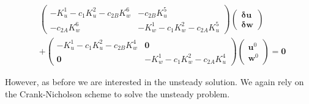 \documentclass[11pt,fleqn]{article}
\theoremstyle{defstyle}
\begin{document}
\begin{equation}
\begin{aligned}
&\begin{pmatrix}
-K^1_u - c_1K^2_u  -c_{2B}K^6_w & -c_{2B}K^5_u \\
-c_{2A}K^6_w & - K^1_w-c_1 K^2_w -c_{2A}K^5_u
\end{pmatrix} \begin{pmatrix}
\mathbf{\delta u} \\ \mathbf{\delta w} 
\end{pmatrix} \\ 
&+ \begin{pmatrix}
-K^1_u -c_1K^2_u-c_{2B}K^4_w & \mathbf{0} \\
\mathbf{0} & -K^1_w -c_1K^2_w-c_{2A}K^4_u
\end{pmatrix}\begin{pmatrix}
\mathbf{u}^0 \\ \mathbf{w}^0 
\end{pmatrix} = \mathbf{0}
\end{aligned}
\label{eq_p4mat2}
\end{equation}

However, as before we are interested in the unsteady solution. We again rely on the Crank-Nicholson scheme to solve the unsteady problem. 


\newpage


\end{document}
